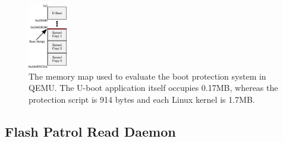 
\begin{figure}
  \centering
  \includegraphics[width=0.15\textwidth]{images/mem_map}
  \caption{The memory map used to evaluate the boot protection system in QEMU.
           The U-boot application itself occupies 0.17MB, whereas the protection
           script is 914 bytes and each Linux kernel is
           1.7MB.}\label{fig:mem_map}
\end{figure}

\subsection{Flash Patrol Read Daemon}
